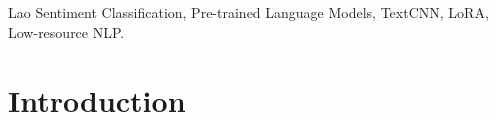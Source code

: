 \documentclass[conference, onecolumn]{IEEEtran}
\begin{document}
\begin{IEEEkeywords}
Lao Sentiment Classification, Pre-trained Language Models, TextCNN, LoRA, Low-resource NLP.
\end{IEEEkeywords}

\section{Introduction}
\label{sec:introduction}



\end{document}
